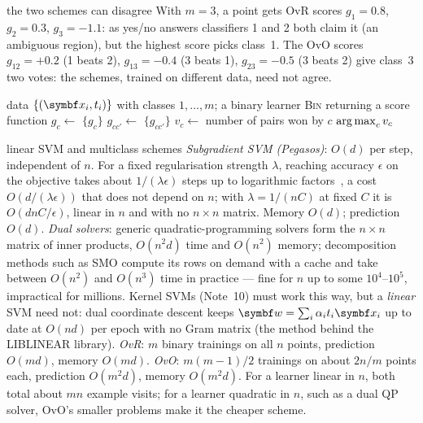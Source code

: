 \documentclass[11pt]{article}
\newcommand{\w}{\vect{w}}
\begin{document}
\begin{worked}{the two schemes can disagree}
With $m = 3$, a point gets OvR scores $g_1 = 0.8$, $g_2 = 0.3$, $g_3 = -1.1$: as yes/no answers classifiers 1 and 2 both
claim it (an ambiguous region), but the highest score picks class~1. The OvO scores $g_{12} = +0.2$ (1 beats 2),
$g_{13} = -0.4$ (3 beats 1), $g_{23} = -0.5$ (3 beats 2) give class~3 two votes: the schemes, trained on different data,
need not agree.
\end{worked}

\begin{algorithm}[htbp]
\caption{One-versus-rest and one-versus-one.}\label{alg:multiclass}
\begin{algorithmic}[1]
\Require data $\{(\x_i, t_i)\}$ with classes $1, \dots, m$; a binary learner \textsc{Bin} returning a score function
 
    \State $g_c \gets$ 
  \EndFor
  \State \Return $\{g_c\}$
\EndFunction
{}
    \State $g_{cc'} \gets$ 
  \EndFor
  \State \Return $\{g_{cc'}\}$
\EndFunction
{}
  \State $v_c \gets$ number of pairs won by $c$ 
  \State \Return $\operatorname*{arg\,max}_c v_c$ 
\EndFunction
\end{algorithmic}
\end{algorithm}

\begin{runtime}{linear SVM and multiclass schemes}
\emph{Subgradient SVM (Pegasos)}: $O(d)$ per step, independent of $n$. For a fixed regularisation strength $\lambda$,
reaching accuracy $\epsilon$ on the objective takes about $1/(\lambda\epsilon)$ steps up to logarithmic
factors~\cite{shalevshwartz2007}, a cost $O(d/(\lambda\epsilon))$ that does not depend on $n$; with $\lambda = 1/(nC)$ at fixed
$C$ it is $O(dnC/\epsilon)$, linear in $n$ and with no $n \times n$ matrix. Memory $O(d)$; prediction $O(d)$. \emph{Dual
solvers}: generic quadratic-programming solvers form the $n \times n$ matrix of inner products, $O(n^2 d)$ time and
$O(n^2)$ memory; decomposition methods such as SMO compute its rows on demand with a cache and take between $O(n^2)$ and
$O(n^3)$ time in practice --- fine for $n$ up to some $10^4$--$10^5$, impractical for millions. Kernel SVMs (Note~10) must
work this way, but a \emph{linear} SVM need not: dual coordinate descent keeps $\w = \sum_i \alpha_i t_i\x_i$ up to date
at $O(nd)$ per epoch with no Gram matrix (the method behind the LIBLINEAR library). \emph{OvR}: $m$ binary trainings on all
$n$ points, prediction $O(md)$, memory $O(md)$. \emph{OvO}: $m(m-1)/2$ trainings on about $2n/m$ points each, prediction
$O(m^2 d)$, memory $O(m^2 d)$. For a learner linear in $n$, both total about $mn$ example visits; for a learner quadratic in
$n$, such as a dual QP solver, OvO's smaller problems make it the cheaper scheme.
\end{runtime}
\end{document}
